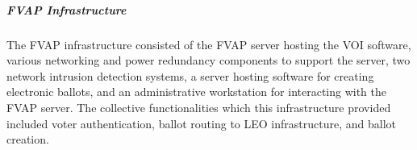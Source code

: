 \subparagraph{FVAP Infrastructure}
The FVAP infrastructure consisted of the FVAP server hosting the VOI software,
various networking and power redundancy components to support the server, two
network intrusion detection systems, a server hosting software for creating
electronic ballots, and an administrative workstation for interacting with the
FVAP server. The collective functionalities which this infrastructure provided
included voter authentication, ballot routing to LEO infrastructure, and ballot
creation.

%
%

